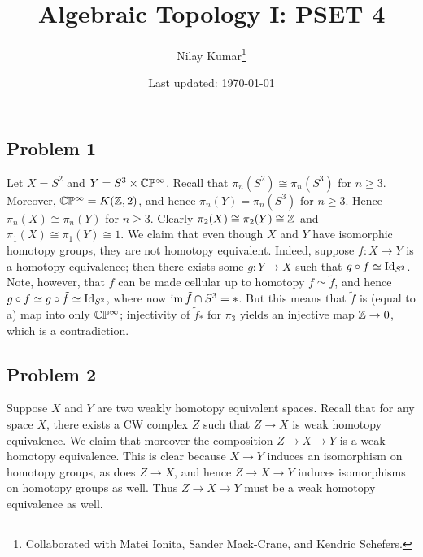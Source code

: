 \documentclass{../mathnotes}
\title{Algebraic Topology I: PSET 4}
\author{Nilay Kumar\footnote{Collaborated with Matei Ionita, Sander Mack-Crane, and Kendric Schefers.}}
\date{Last updated: \today}
\begin{document}
\maketitle

\subsection*{Problem 1}
Let $X=S^2$ and $Y=S^3\times\mathbb{C}\mathbb{P}^\infty$. Recall that $\pi_n(S^2)\cong\pi_n(S^3)$ for $n\geq 3$.
Moreover, $\mathbb{C}\mathbb{P}^\infty=K(\mathbb{Z},2)$, and hence $\pi_n(Y)=\pi_n(S^3)$ for $n\geq 3$.
Hence $\pi_n(X)\cong\pi_n(Y)$ for $n\geq 3$. Clearly $\pi_2(X)\cong\pi_2(Y)\cong\mathbb{Z}$ and
$\pi_1(X)\cong\pi_1(Y)\cong1$. We claim that even though $X$ and $Y$ have isomorphic homotopy groups,
they are not homotopy equivalent. Indeed, suppose $f:X\to Y$ is a homotopy equivalence; then
there exists some $g:Y\to X$ such that $g\circ f\simeq \operatorname{Id}_{S^2}$. Note, however, that $f$ can
be made cellular up to homotopy $f\simeq\tilde f$, and hence $g\circ f\simeq g\circ\tilde f\simeq \operatorname{Id}_{S^2}$,
where now $\operatorname{im}\tilde f\cap S^3=*$. But this means that $\tilde f$ is (equal to a) map into only
$\mathbb{C}\mathbb{P}^\infty$; injectivity of $\tilde f_*$ for $\pi_3$ yields an injective map $\mathbb{Z}\to 0$, which
is a contradiction.

\subsection*{Problem 2}
Suppose $X$ and $Y$ are two weakly homotopy equivalent spaces. Recall that for any space $X$, there
exists a CW complex $Z$ such that $Z\to X$ is weak homotopy equivalence. We claim that moreover the
composition $Z\to X\to Y$ is a weak homotopy equivalence. This is clear because $X\to Y$ induces an
isomorphism on homotopy groups, as does $Z\to X$, and hence $Z\to X\to Y$ induces isomorphisms on
homotopy groups as well. Thus $Z\to X\to Y$ must be a weak homotopy equivalence as well.
\end{document}
